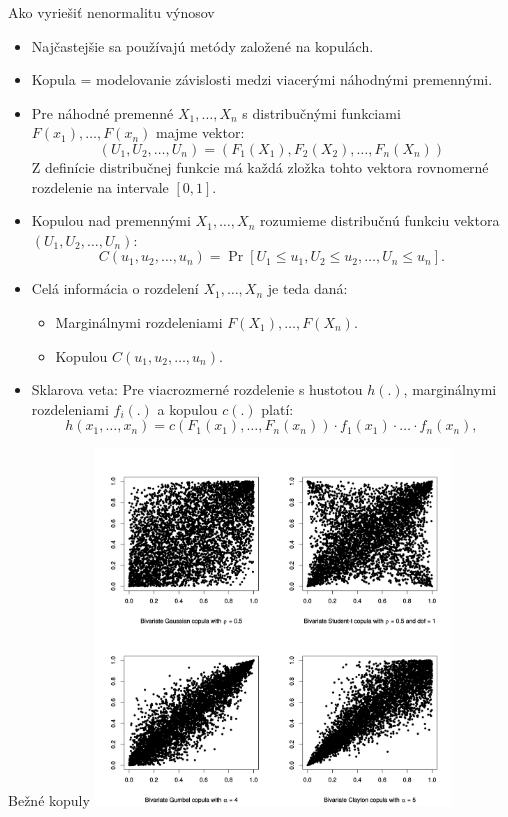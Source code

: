 \documentclass{Bredelebeamer}
\begin{document}
\begin{frame}{Ako vyriešiť nenormalitu výnosov}
	\begin{itemize}
		\item Najčastejšie sa používajú metódy založené na kopulách.
		\item Kopula = modelovanie závislosti medzi viacerými náhodnými premennými.
		\item Pre náhodné premenné $X_1, \ldots, X_n$ s distribučnými funkciami $F(x_1), \ldots, F(x_n)$ majme vektor:\\
		\begin{equation}
			{\displaystyle (U_{1},U_{2},\dots ,U_{n})=\left(F_{1}(X_{1}),F_{2}(X_{2}),\dots ,F_{n}(X_{n})\right)}
		\end{equation}
		Z definície distribučnej funkcie má každá zložka tohto vektora rovnomerné rozdelenie na intervale $[0,1]$.
		\item Kopulou nad premennými $X_1, \ldots, X_n$ rozumieme distribučnú funkciu vektora $(U_{1},U_{2},\dots ,U_{n})$:
		\begin{equation}
			{\displaystyle C(u_{1},u_{2},\dots ,u_{n})=\Pr[U_{1}\leq u_{1},U_{2}\leq u_{2},\dots ,U_{n}\leq u_{n}].}		
		\end{equation}
		\item Celá informácia o rozdelení $X_1, \ldots, X_n$ je teda daná:
		\begin{itemize}
			\item Marginálnymi rozdeleniami $F(X_1), \ldots, F(X_n)$.
			\item Kopulou $C(u_{1},u_{2},\dots ,u_{n})$.
		\end{itemize}
		\item Sklarova veta: Pre viacrozmerné rozdelenie s hustotou $h(.)$, marginálnymi rozdeleniami $f_i(.)$ a kopulou $c(.)$ platí:
		\begin{equation}
			{\displaystyle h(x_{1},\dots ,x_{n})=c(F_{1}(x_{1}),\dots ,F_{n}(x_{n}))\cdot f_{1}(x_{1})\cdot \dots \cdot f_{n}(x_{n}),}
		\end{equation}
	\end{itemize}
\end{frame}

\begin{frame}{Bežné kopuly}
	\centering
	\includegraphics[width=0.71\textwidth]{Figures/Four_Correlations}
\end{frame}
\end{document}
